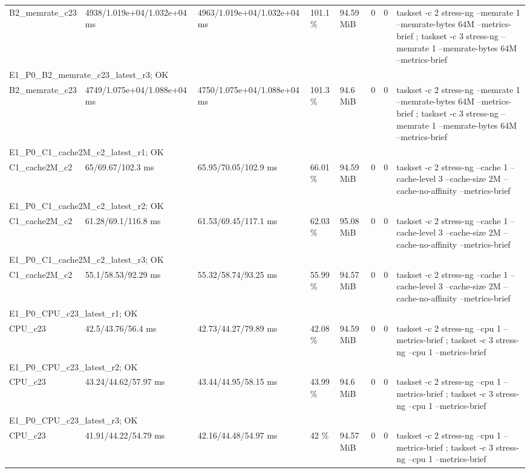 \begin{tabular}{llllllll}
B2\_memrate\_c23 & 4938/1.019e+04/1.032e+04 ms & 4963/1.019e+04/1.032e+04 ms & 101.1 \% & 94.59 MiB & 0 & 0 & taskset -c 2 stress-ng --memrate 1 --memrate-bytes 64M --metrics-brief ; taskset -c 3 stress-ng --memrate 1 --memrate-bytes 64M --metrics-brief \\
\multicolumn{8}{l}{E1\_P0\_B2\_memrate\_c23\_latest\_r3; OK} \\
B2\_memrate\_c23 & 4749/1.075e+04/1.088e+04 ms & 4750/1.075e+04/1.088e+04 ms & 101.3 \% & 94.6 MiB & 0 & 0 & taskset -c 2 stress-ng --memrate 1 --memrate-bytes 64M --metrics-brief ; taskset -c 3 stress-ng --memrate 1 --memrate-bytes 64M --metrics-brief \\
\multicolumn{8}{l}{E1\_P0\_C1\_cache2M\_c2\_latest\_r1; OK} \\
C1\_cache2M\_c2 & 65/69.67/102.3 ms & 65.95/70.05/102.9 ms & 66.01 \% & 94.59 MiB & 0 & 0 & taskset -c 2 stress-ng --cache 1 --cache-level 3 --cache-size 2M --cache-no-affinity --metrics-brief \\
\multicolumn{8}{l}{E1\_P0\_C1\_cache2M\_c2\_latest\_r2; OK} \\
C1\_cache2M\_c2 & 61.28/69.1/116.8 ms & 61.53/69.45/117.1 ms & 62.03 \% & 95.08 MiB & 0 & 0 & taskset -c 2 stress-ng --cache 1 --cache-level 3 --cache-size 2M --cache-no-affinity --metrics-brief \\
\multicolumn{8}{l}{E1\_P0\_C1\_cache2M\_c2\_latest\_r3; OK} \\
C1\_cache2M\_c2 & 55.1/58.53/92.29 ms & 55.32/58.74/93.25 ms & 55.99 \% & 94.57 MiB & 0 & 0 & taskset -c 2 stress-ng --cache 1 --cache-level 3 --cache-size 2M --cache-no-affinity --metrics-brief \\
\multicolumn{8}{l}{E1\_P0\_CPU\_c23\_latest\_r1; OK} \\
CPU\_c23 & 42.5/43.76/56.4 ms & 42.73/44.27/79.89 ms & 42.08 \% & 94.59 MiB & 0 & 0 & taskset -c 2 stress-ng --cpu 1 --metrics-brief ; taskset -c 3 stress-ng --cpu 1 --metrics-brief \\
\multicolumn{8}{l}{E1\_P0\_CPU\_c23\_latest\_r2; OK} \\
CPU\_c23 & 43.24/44.62/57.97 ms & 43.44/44.95/58.15 ms & 43.99 \% & 94.6 MiB & 0 & 0 & taskset -c 2 stress-ng --cpu 1 --metrics-brief ; taskset -c 3 stress-ng --cpu 1 --metrics-brief \\
\multicolumn{8}{l}{E1\_P0\_CPU\_c23\_latest\_r3; OK} \\
CPU\_c23 & 41.91/44.22/54.79 ms & 42.16/44.48/54.97 ms & 42 \% & 94.57 MiB & 0 & 0 & taskset -c 2 stress-ng --cpu 1 --metrics-brief ; taskset -c 3 stress-ng --cpu 1 --metrics-brief \\
\bottomrule
\end{tabular}
